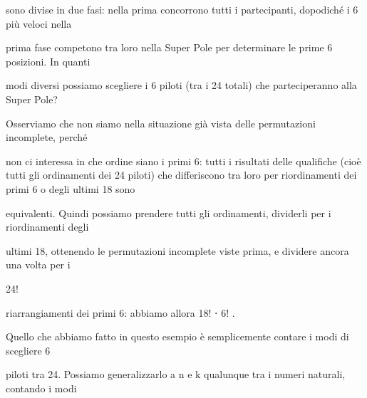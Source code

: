 \documentclass[a4paper,portrait,12pt]{article}
\begin{document}
\begin{flushleft}
sono divise in due fasi: nella prima concorrono tutti i partecipanti, dopodich\'{e} i 6 più veloci nella
\end{flushleft}


\begin{flushleft}
prima fase competono tra loro nella Super Pole per determinare le prime 6 posizioni. In quanti
\end{flushleft}


\begin{flushleft}
modi diversi possiamo scegliere i 6 piloti (tra i 24 totali) che parteciperanno alla Super Pole?
\end{flushleft}


\begin{flushleft}
Osserviamo che non siamo nella situazione gi\`{a} vista delle permutazioni incomplete, perch\'{e}
\end{flushleft}


\begin{flushleft}
non ci interessa in che ordine siano i primi 6: tutti i risultati delle qualifiche (cio\`{e} tutti gli ordinamenti dei 24 piloti) che differiscono tra loro per riordinamenti dei primi 6 o degli ultimi 18 sono
\end{flushleft}


\begin{flushleft}
equivalenti. Quindi possiamo prendere tutti gli ordinamenti, dividerli per i riordinamenti degli
\end{flushleft}


\begin{flushleft}
ultimi 18, ottenendo le permutazioni incomplete viste prima, e dividere ancora una volta per i
\end{flushleft}


24!


\begin{flushleft}
riarrangiamenti dei primi 6: abbiamo allora 18! ⋅ 6! .
\end{flushleft}


\begin{flushleft}
Quello che abbiamo fatto in questo esempio \`{e} semplicemente contare i modi di scegliere 6
\end{flushleft}


\begin{flushleft}
piloti tra 24. Possiamo generalizzarlo a n e k qualunque tra i numeri naturali, contando i modi
\end{flushleft}
\end{document}
